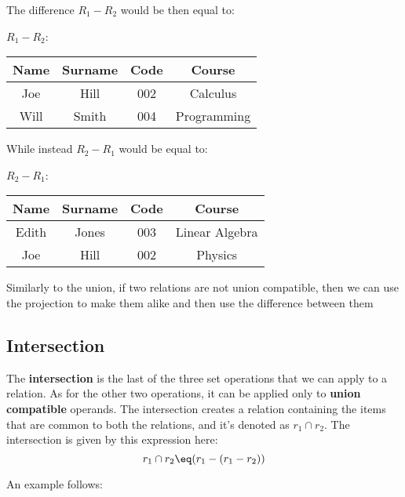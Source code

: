The difference $R_1 - R_2$ would be then equal to:

\begin{center}
    $R_1 - R_2$: \quad \begin{tabular}{|c|c|c|c|}
        \hline \rowcolor{maindoccol!60}
        \textbf{Name} & \textbf{Surname} & \textbf{Code} & \textbf{Course} \\
        \hline
        Joe & Hill & 002 & Calculus \\
        \hline
        Will & Smith & 004 & Programming \\
        \hline
    \end{tabular}
\end{center}

While instead $R_2 - R_1$ would be equal to:

\begin{center}
    $R_2 - R_1$: \quad \begin{tabular}{|c|c|c|c|}
        \hline \rowcolor{maindoccol!60}
        \textbf{Name} & \textbf{Surname} & \textbf{Code} & \textbf{Course} \\
        \hline
        Edith & Jones & 003 & Linear Algebra \\
        \hline
        Joe & Hill & 002 & Physics \\
        \hline
    \end{tabular}
\end{center}

Similarly to the union, if two relations are not union compatible, then we can use the projection to make them alike and then use the difference between them

\subsection{Intersection}

The \textbf{intersection} is the last of the three set operations that we can apply to a relation. As for the other two operations, it can be applied only to \textbf{union compatible} operands. The intersection creates a relation containing the items that are common to both the relations, and it's denoted as $r_1 \cap r_2$. The intersection is given by this expression here:
\[ r_1 \cap r_2 \eq (r_1 - (r_1 - r_2)) \]

An example follows:

